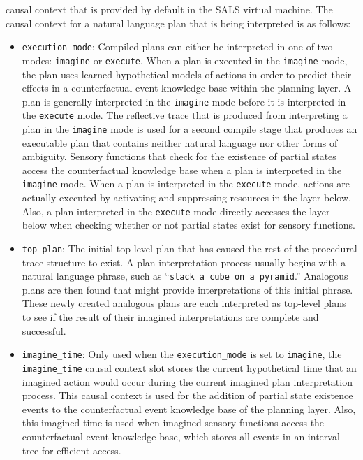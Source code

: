 causal context that is provided by default in the SALS virtual
machine.  The causal context for a natural language plan that is being
interpreted is as follows:
\begin{itemize}
\item {\tt{execution\_mode}}: Compiled plans can either be interpreted
  in one of two modes: {\tt{imagine}} or {\tt{execute}}.  When a plan
  is executed in the {\tt{imagine}} mode, the plan uses learned
  hypothetical models of actions in order to predict their effects in
  a counterfactual event knowledge base within the planning layer.  A
  plan is generally interpreted in the {\tt{imagine}} mode before it
  is interpreted in the {\tt{execute}} mode.  The reflective trace
  that is produced from interpreting a plan in the {\tt{imagine}} mode
  is used for a second compile stage that produces an executable plan
  that contains neither natural language nor other forms of ambiguity.
  Sensory functions that check for the existence of partial states
  access the counterfactual knowledge base when a plan is interpreted
  in the {\tt{imagine}} mode.  When a plan is interpreted in the
  {\tt{execute}} mode, actions are actually executed by activating and
  suppressing resources in the layer below.  Also, a plan interpreted
  in the {\tt{execute}} mode directly accesses the layer below when
  checking whether or not partial states exist for sensory functions.
\item {\tt{top\_plan}}: The initial top-level plan that has caused the
  rest of the procedural trace structure to exist.  A plan
  interpretation process usually begins with a natural language
  phrase, such as ``{\tt{stack a cube on a pyramid}}.''  Analogous
  plans are then found that might provide interpretations of this
  initial phrase.  These newly created analogous plans are each
  interpreted as top-level plans to see if the result of their
  imagined interpretations are complete and successful.
\item {\tt{imagine\_time}}: Only used when the {\tt{execution\_mode}}
  is set to {\tt{imagine}}, the {\tt{imagine\_time}} causal context
  slot stores the current hypothetical time that an imagined action
  would occur during the current imagined plan interpretation process.
  This causal context is used for the addition of partial state
  existence events to the counterfactual event knowledge base of the
  planning layer.  Also, this imagined time is used when imagined
  sensory functions access the counterfactual event knowledge base,
  which stores all events in an interval tree for efficient access.

\end{itemize}
